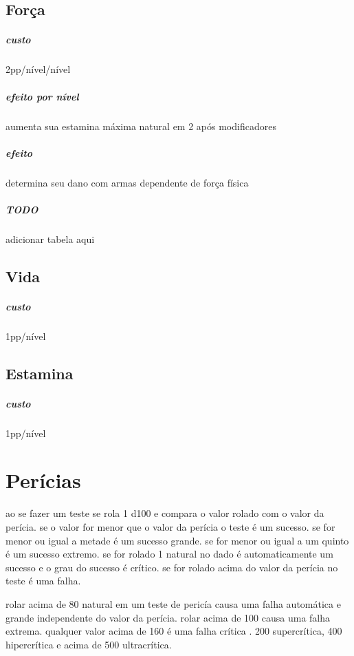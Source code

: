 \section{Força}
\paragraph{custo} 2pp/nível/nível
\paragraph{efeito por nível} aumenta sua estamina máxima natural em 2 após modificadores
\paragraph{efeito} determina seu dano com armas dependente de força física
\paragraph{TODO} adicionar tabela aqui
%
%
\section{Vida}
\paragraph{custo} 1pp/nível
%
%
\section{Estamina}
\paragraph{custo} 1pp/nível
%
%
%
%
\chapter{Perícias}
ao se fazer um teste se rola 1 d100 e compara o valor rolado com o valor da perícia.
se o valor for menor que o valor da perícia o teste é um sucesso.
se for menor ou igual a metade é um sucesso grande.
se for menor ou igual a um quinto é um sucesso extremo.
se for rolado 1 natural no dado é automaticamente um sucesso e o grau do sucesso é crítico.
se for rolado acima do valor da perícia no teste é uma falha.

rolar acima de 80 natural em um teste de pericía causa uma falha automática e grande independente do valor da perícia.
rolar acima de 100 causa uma falha extrema. qualquer valor acima de 160 é uma falha crítica .
200 supercrítica, 400 hipercrítica e acima de 500 ultracrítica.

